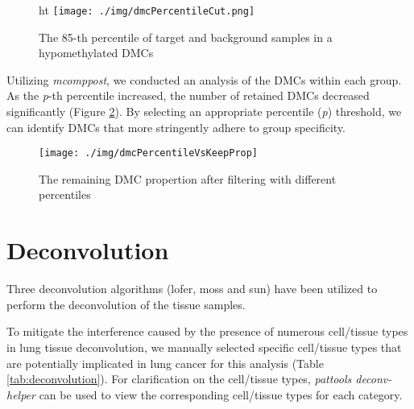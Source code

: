 \documentclass[12pt,letterpaper]{article}
\begin{document}
\begin{figure}{ht}
    \centering
    \texttt{[image: ./img/dmcPercentileCut.png]}
    \caption{The 85-th percentile of target and background samples in a hypomethylated DMCs}
    \label{fig:dmcPC}
\end{figure}

Utilizing \emph{mcomppost}, we conducted an analysis of the DMCs within each group. As
the \textit{p}-th percentile increased, the number of retained DMCs decreased significantly
(Figure \ref*{fig:dmcPK}). By selecting an appropriate percentile (\textit{p}) threshold,
we can identify DMCs that more stringently adhere to
group specificity.


\begin{figure}[htbp]
    \centering
    \texttt{[image: ./img/dmcPercentileVsKeepProp]}
    \caption{The remaining DMC propertion after filtering with different percentiles}
    \label{fig:dmcPK}
\end{figure}

\section{Deconvolution}\label{sec:deconvolution}
Three deconvolution algorithms (lofer\cite{Loyfer2024.05.08.593132}, moss \cite{moss_comprehensive_2018}
and sun\cite{sun_plasma_2015}) have been utilized to perform the deconvolution of the tissue samples.

To mitigate the interference caused by the presence of numerous cell/tissue types in
lung tissue deconvolution, we manually selected specific cell/tissue types that are potentially
implicated in lung cancer for this analysis (Table \ref*{tab:deconvolution}). For clarification
on the cell/tissue types, \textit{pattools deconv-helper} can be used to view the corresponding
cell/tissue types for each category.
\end{document}
